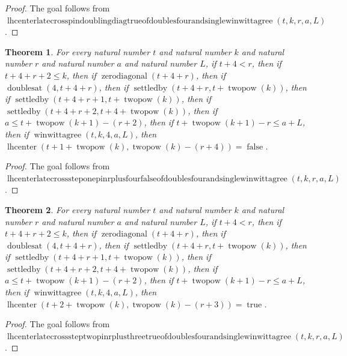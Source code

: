 \documentclass[11pt]{article}
\newtheorem{theorem}{Theorem}[section]
\theoremstyle{definition}
\begin{document}
\begin{proof}
The goal follows from \(\operatorname{lhcenterlatecrosspindoublingdiagtrueofdoublesfourandsinglewinwittagree}(t, k, r, a, L)\).
\end{proof}
\begin{theorem}
\label{ll:paper:lhcenter-late-cross-step-one-pin-r-plus-four-false-of-doubles-four-and-single-winwittagree}
For every natural number \(t\) and natural number \(k\) and natural number \(r\) and natural number \(a\) and natural number \(L\), if \(t + 4 < r\), then if \(t + 4 + r + 2 \le k\), then if \(\operatorname{zerodiagonal}(t + 4 + r)\), then if \(\operatorname{doublesat}(4, t + 4 + r)\), then if \(\operatorname{settledby}(t + 4 + r, t + \operatorname{twopow}(k))\), then if \(\operatorname{settledby}(t + 4 + r + 1, t + \operatorname{twopow}(k))\), then if \(\operatorname{settledby}(t + 4 + r + 2, t + 4 + \operatorname{twopow}(k))\), then if \(a \le t + \operatorname{twopow}(k + 1) - (r + 2)\), then if \(t + \operatorname{twopow}(k + 1) - r \le a + L\), then if \(\operatorname{winwittagree}(t, k, 4, a, L)\), then \(\operatorname{lhcenter}(t + 1 + \operatorname{twopow}(k), \operatorname{twopow}(k) - (r + 4)) = \operatorname{false}\).
\end{theorem}
\begin{proof}
The goal follows from \(\operatorname{lhcenterlatecrosssteponepinrplusfourfalseofdoublesfourandsinglewinwittagree}(t, k, r, a, L)\).
\end{proof}
\begin{theorem}
\label{ll:paper:lhcenter-late-cross-step-two-pin-r-plus-three-true-of-doubles-four-and-single-winwittagree}
For every natural number \(t\) and natural number \(k\) and natural number \(r\) and natural number \(a\) and natural number \(L\), if \(t + 4 < r\), then if \(t + 4 + r + 2 \le k\), then if \(\operatorname{zerodiagonal}(t + 4 + r)\), then if \(\operatorname{doublesat}(4, t + 4 + r)\), then if \(\operatorname{settledby}(t + 4 + r, t + \operatorname{twopow}(k))\), then if \(\operatorname{settledby}(t + 4 + r + 1, t + \operatorname{twopow}(k))\), then if \(\operatorname{settledby}(t + 4 + r + 2, t + 4 + \operatorname{twopow}(k))\), then if \(a \le t + \operatorname{twopow}(k + 1) - (r + 2)\), then if \(t + \operatorname{twopow}(k + 1) - r \le a + L\), then if \(\operatorname{winwittagree}(t, k, 4, a, L)\), then \(\operatorname{lhcenter}(t + 2 + \operatorname{twopow}(k), \operatorname{twopow}(k) - (r + 3)) = \operatorname{true}\).
\end{theorem}
\begin{proof}
The goal follows from \(\operatorname{lhcenterlatecrosssteptwopinrplusthreetrueofdoublesfourandsinglewinwittagree}(t, k, r, a, L)\).
\end{proof}
\end{document}
